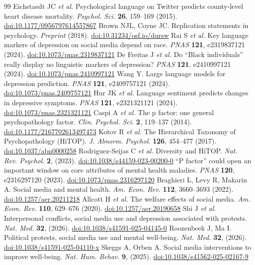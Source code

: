 \documentclass[11pt]{article}
\newcommand{\doi}[1]{\href{https://doi.org/#1}{doi:#1}}
\begin{document}
\begin{thebibliography}{99}
 Eichstaedt JC \emph{et al.} Psychological language on Twitter predicts county-level heart disease mortality. \emph{Psychol. Sci.} \textbf{26}, 159--169 (2015). \doi{10.1177/0956797614557867}
 Brown NJL, Coyne JC. Replication statements in psychology. \emph{Preprint} (2018). \doi{10.31234/osf.io/dursw}
 Rai S \emph{et al.} Key language markers of depression on social media depend on race. \emph{PNAS} \textbf{121}, e2319837121 (2024). \doi{10.1073/pnas.2319837121}
 De Freitas J \emph{et al.} Do ``Black individuals'' really display no linguistic markers of depression? \emph{PNAS} \textbf{121}, e2410997121 (2024). \doi{10.1073/pnas.2410997121}
 Wang Y. Large language models for depression prediction. \emph{PNAS} \textbf{121}, e2409757121 (2024). \doi{10.1073/pnas.2409757121}
 Hur JK \emph{et al.} Language sentiment predicts changes in depressive symptoms. \emph{PNAS} \textbf{121}, e2321321121 (2024). \doi{10.1073/pnas.2321321121}
 Caspi A \emph{et al.} The p factor: one general psychopathology factor. \emph{Clin. Psychol. Sci.} \textbf{2}, 119--137 (2014). \doi{10.1177/2167702613497473}
 Kotov R \emph{et al.} The Hierarchical Taxonomy of Psychopathology (HiTOP). \emph{J. Abnorm. Psychol.} \textbf{126}, 454--477 (2017). \doi{10.1037/abn0000258}
 Rodriguez-Seijas C \emph{et al.} Diversity and HiTOP. \emph{Nat. Rev. Psychol.} \textbf{2}, (2023). \doi{10.1038/s44159-023-00200-0}
 ``P factor'' could open an important window on core attributes of mental health maladies. \emph{PNAS} \textbf{120}, e2316297120 (2023). \doi{10.1073/pnas.2316297120}
 Braghieri L, Levy R, Makarin A. Social media and mental health. \emph{Am. Econ. Rev.} \textbf{112}, 3660--3693 (2022). \doi{10.1257/aer.20211218}
 Allcott H \emph{et al.} The welfare effects of social media. \emph{Am. Econ. Rev.} \textbf{110}, 629--676 (2020). \doi{10.1257/aer.20190658}
 Shi J \emph{et al.} Interpersonal conflicts, social media use and depression associated with protests. \emph{Nat. Med.} \textbf{32}, (2026). \doi{10.1038/s41591-025-04145-0}
 Roozenbeek J, Ma I. Political protests, social media use and mental well-being. \emph{Nat. Med.} \textbf{32}, (2026). \doi{10.1038/s41591-025-04110-x}
 Skeggs A, Orben A. Social media interventions to improve well-being. \emph{Nat. Hum. Behav.} \textbf{9}, (2025). \doi{10.1038/s41562-025-02167-9}

\end{thebibliography}
\end{document}
